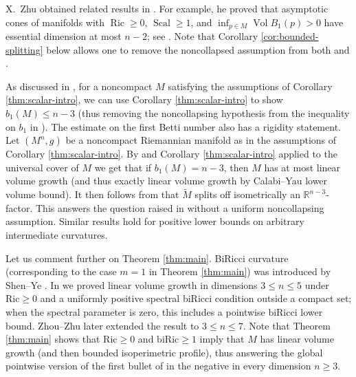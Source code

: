 \documentclass[11pt]{amsart}
\theoremstyle{definition}
\theoremstyle{remark}
\DeclareMathOperator{\Ric}{Ric}
\DeclareMathOperator{\Scal}{Scal}
\DeclareMathOperator{\Vol}{Vol}
\begin{document}
X.~Zhu obtained related results in \cite{XZhu}.  For example, he proved that asymptotic cones of manifolds with
$\Ric\geq0$, $\Scal\geq1$, and
$\inf_{p\in M}\Vol B_1(p)>0$ have essential dimension at most
$n-2$; see \cite[Theorem 1.6]{XZhu}. Note that Corollary \ref{cor:bounded-splitting} below allows one to remove the noncollapsed
assumption from both \cite[Theorem 1.6]{XZhu} and \cite[Theorem 1.1(1)]{WangXieZhuZhu}.
\vspace{0.1cm}

As
discussed in \cite[Remark~1.5]{WangXieZhuZhu},
for a noncompact $M$ satisfying the assumptions of Corollary \ref{thm:scalar-intro}, we can use Corollary \ref{thm:scalar-intro} to show
$b_1(M)\leq n-3$ (thus removing the noncollapsing hypothesis from the inequality on $b_1$ in \cite[Theorem 1.3]{XZhu}). The estimate on the first Betti number also has a rigidity statement. Let $(M^n,g)$ be a noncompact Riemannian manifold as in the assumptions of Corollary \ref{thm:scalar-intro}.  By \cite{AndersonTopology} and Corollary \ref{thm:scalar-intro} applied to the universal cover of $M$ we get that if $b_1(M)=n-3$, then $M$ has at most linear volume
growth (and thus exactly linear volume growth by Calabi--Yau lower volume bound).  It then follows from
\cite[Theorem~A and Remark~1.2(2)]{HuangHuangSlowGrowth} that
$\widetilde M$ splits off isometrically an
$\mathbb R^{n-3}$-factor. This answers the question raised in
\cite[Remark~5.4]{XZhu} without a uniform noncollapsing assumption. Similar results hold for positive lower bounds on arbitrary intermediate curvatures.
\vspace{0.1cm}

Let us comment further on Theorem \ref{thm:main}.  BiRicci
curvature (corresponding to the case $m=1$ in Theorem \ref{thm:main}) was introduced by Shen--Ye \cite{ShenYe}.
In \cite[Theorem 3(1)]{AntonelliXu} we proved linear volume growth in dimensions $3\leq n\leq 5$ under $\mathrm{Ric}\geq 0$ and a uniformly positive spectral biRicci condition outside a compact set; when the spectral parameter is zero, this includes a pointwise biRicci lower bound.  Zhou--Zhu \cite{ZhouZhu} later extended the result to $3\leq n\leq 7$. Note that Theorem \ref{thm:main} shows that $\mathrm{Ric}\geq 0$ and $\mathrm{biRic}\geq 1$ imply that $M$ has linear volume growth (and then bounded isoperimetric profile), thus answering the global pointwise version of the first bullet of \cite[Question 1]{AntonelliXu} in the negative in every dimension $n\geq 3$. 
\vspace{0.1cm}
\end{document}
